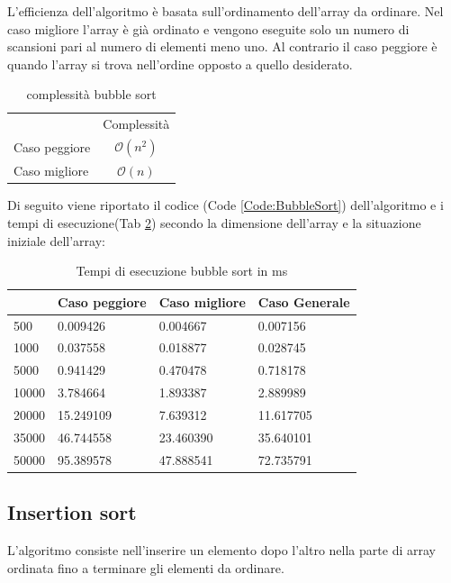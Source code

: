 \documentclass[12pt, a4paper]{report}
\begin{document}
L'efficienza dell'algoritmo è basata sull'ordinamento dell'array da ordinare. Nel caso migliore l'array è già ordinato e vengono eseguite solo un numero di scansioni pari al numero di elementi meno uno. Al contrario il caso peggiore è quando l'array si trova nell'ordine opposto a quello desiderato.

\begin{table}[ht]
	\centering
	\begin{tabular}{lc}
 & Complessità \\
Caso peggiore & $ \mathcal{O}(n^2)$ \\
Caso migliore & $ \mathcal{O}(n)$ \\
\end{tabular}
	\caption{complessità bubble sort}
	\label{Tab:CompBubbleSort}
\end{table}

Di seguito viene riportato il codice (Code \ref{Code:BubbleSort}) dell'algoritmo e i tempi di esecuzione(Tab \ref{Tab:Tempi esecuzione Bubblesort}) secondo la dimensione dell'array e la situazione iniziale dell'array:
	

\begin{table}[ht]
\centering
\begin{tabular}{| l | l | l | l |}
\hline
 & Caso peggiore & Caso migliore & Caso Generale \\ \hline
500 & 0.009426 & 0.004667 & 0.007156 \\ \hline
1000 & 0.037558 & 0.018877 & 0.028745 \\ \hline
5000 & 0.941429 & 0.470478 & 0.718178 \\ \hline
10000 & 3.784664 & 1.893387 & 2.889989 \\ \hline
20000 & 15.249109 & 7.639312 & 11.617705 \\ \hline
35000 & 46.744558 & 23.460390 & 35.640101 \\ \hline
50000 & 95.389578 & 47.888541 & 72.735791 \\ \hline
\end{tabular}
\caption{Tempi di esecuzione bubble sort in ms}
\label{Tab:Tempi esecuzione Bubblesort}
\end{table}

\newpage
\subsection{Insertion sort}
L'algoritmo consiste nell'inserire un elemento dopo l'altro nella parte di array ordinata fino a terminare gli elementi da ordinare.
\end{document}
